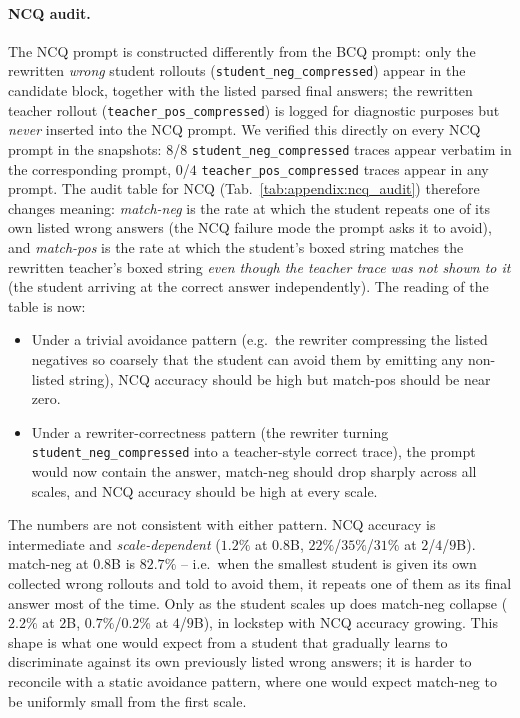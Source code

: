 \documentclass{llmxive}
\begin{document}
\paragraph{NCQ audit.}
The NCQ prompt is constructed differently from the BCQ prompt: only the rewritten \emph{wrong} student rollouts (\texttt{student\_neg\_compressed}) appear in the candidate block, together with the listed parsed final answers; the rewritten teacher rollout (\texttt{teacher\_pos\_compressed}) is logged for diagnostic purposes but \emph{never} inserted into the NCQ prompt. We verified this directly on every NCQ prompt in the snapshots: $8$/$8$ \texttt{student\_neg\_compressed} traces appear verbatim in the corresponding prompt, $0$/$4$ \texttt{teacher\_pos\_compressed} traces appear in any prompt. The audit table for NCQ (Tab.~\ref{tab:appendix:ncq_audit}) therefore changes meaning: \emph{match-neg} is the rate at which the student repeats one of its own listed wrong answers (the NCQ failure mode the prompt asks it to avoid), and \emph{match-pos} is the rate at which the student's boxed string matches the rewritten teacher's boxed string \emph{even though the teacher trace was not shown to it} (the student arriving at the correct answer independently). The reading of the table is now:
\begin{itemize}[leftmargin=12pt,topsep=2pt,itemsep=2pt]
  \item Under a trivial avoidance pattern (e.g.\ the rewriter compressing the listed negatives so coarsely that the student can avoid them by emitting any non-listed string), NCQ accuracy should be high but match-pos should be near zero.
  \item Under a rewriter-correctness pattern (the rewriter turning \texttt{student\_neg\_compressed} into a teacher-style correct trace), the prompt would now contain the answer, match-neg should drop sharply across all scales, and NCQ accuracy should be high at every scale.
\end{itemize}
The numbers are not consistent with either pattern. NCQ accuracy is intermediate and \emph{scale-dependent} ($1.2\%$ at $0.8$B, $22\%$/$35\%$/$31\%$ at $2$/$4$/$9$B). match-neg at $0.8$B is $82.7\%$ -- i.e.\ when the smallest student is given its own collected wrong rollouts and told to avoid them, it repeats one of them as its final answer most of the time. Only as the student scales up does match-neg collapse ($2.2\%$ at $2$B, $0.7\%$/$0.2\%$ at $4$/$9$B), in lockstep with NCQ accuracy growing. This shape is what one would expect from a student that gradually learns to discriminate against its own previously listed wrong answers; it is harder to reconcile with a static avoidance pattern, where one would expect match-neg to be uniformly small from the first scale.
\end{document}
